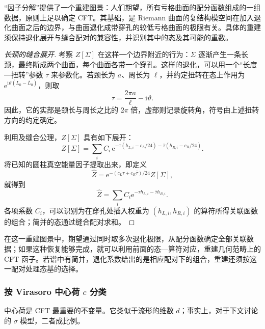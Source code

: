 “因子分解”提供了一个重建图景：人们期望，所有亏格曲面的配分函数组成的一组数据，原则上足以确定 CFT。其基础，是 Riemann 曲面的复结构模空间在加入退化曲面之后的边界，与曲面退化成带穿孔的较低亏格曲面的极限有关。具体的重建须保持退化展开与缝合配对的兼容性，并识别其中的态及其可能的重数。

\begin{proof}[长颈的缝合展开]
考察 $Z[\Sigma]$ 在这样一个边界附近的行为：$\Sigma$ 逐渐产生一条长颈，最终断成两个曲面，每个曲面各带一个穿孔。这样的退化，可以用一个“长度—扭转”参数 $\tau$ 来参数化。若颈长为 $a$、周长为 $\ell$，并约定扭转在态上作用为 $\mathrm{e}^{\mathrm{i}\vartheta(L_0-\overline L_0)}$，则取
\[
\tau=\frac{2\pi a}{\ell}-\mathrm{i}\vartheta.
\]
因此，它的实部是颈长与周长之比的 $2\pi$ 倍，虚部则记录旋转角，符号由上述扭转方向的约定确定。

利用及缝合公理，$Z[\Sigma]$ 具有如下展开：
\[
Z[\Sigma]
=\sum_i C_i\,
\mathrm{e}^{-\tau(h_{L,i}-c_L/24)
-\bar\tau(h_{R,i}-c_R/24)}.
\]
将已知的圆柱真空能量因子提取出来，即定义
\[
\widehat Z
=\mathrm{e}^{-(c_L\tau+c_R\bar\tau)/24}Z[\Sigma],
\]
就得到
\[
\widehat Z=\sum_iC_i\mathrm{e}^{-\tau h_{L,i}-\bar\tau h_{R,i}}.
\]
各项系数 $C_i$，可以识别为在穿孔处插入权重为 $(h_{L,i},h_{R,i})$ 的算符所得关联函数的组合；简并的态通过缝合配对求和。
\end{proof}

在这一重建图景中，期望通过同时取多次退化极限，从配分函数确定全部关联数据；如果这种恢复能够完成，就可以利用前面的态—算符对应，重建几何范畴上的 CFT 函子。若谱中有简并，退化系数给出的是相应配对下的组合，重建还须按这一配对处理态基的选择。

\subsubsection{按 Virasoro 中心荷 \texorpdfstring{$c$}{c} 分类}\label{sec:3.2.2.4}

中心荷是 CFT 最重要的不变量。它类似于流形的维数 $d$；事实上，对于下文讨论的 $\sigma$ 模型，二者成比例。

